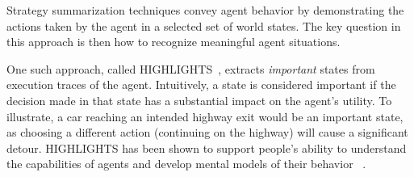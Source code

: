 Strategy summarization techniques convey agent behavior by demonstrating the
actions taken by the agent in a selected set of world states. The key question
in this approach is then how to recognize meaningful agent situations.

One such approach, called HIGHLIGHTS~\cite{amir18highlights}, extracts
\emph{important} states from execution traces of the agent. Intuitively, a state
is considered important if the decision made in that state has a substantial
impact on the agent's utility. To illustrate, a car reaching an intended highway
exit would be an important state, as choosing a different action (continuing on
the highway) will cause a significant detour. 
HIGHLIGHTS has been shown to support people's ability to understand the
capabilities of agents and develop mental models of their behavior
~\cite{amir18highlights,Tobias}. 






